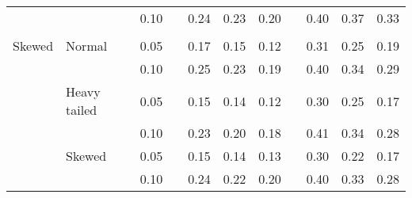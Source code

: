 \begin{table}[ht]
\begin{scriptsize}
\begin{center}
\begin{tabular}{ll p{.1cm} c p{.1cm} rrr p{.1cm} rrr}
             &              && 0.10 &&  0.24 & 0.23 & 0.20 && 0.40 & 0.37 & 0.33 \\ 
             &&&&&&&&&&&\\
Skewed       & Normal       && 0.05 &&  0.17 & 0.15 & 0.12 && 0.31 & 0.25 & 0.19 \\ 
             &              && 0.10 &&  0.25 & 0.23 & 0.19 && 0.40 & 0.34 & 0.29 \\ 
             & Heavy tailed && 0.05 &&  0.15 & 0.14 & 0.12 && 0.30 & 0.25 & 0.17 \\ 
             &              && 0.10 &&  0.23 & 0.20 & 0.18 && 0.41 & 0.34 & 0.28 \\ 
             & Skewed       && 0.05 &&  0.15 & 0.14 & 0.13 && 0.30 & 0.22 & 0.17 \\ 
             &              && 0.10 &&  0.24 & 0.22 & 0.20 && 0.40 & 0.33 & 0.28 \\ 

\hline
\end{tabular}
\end{center}
\end{scriptsize}
\end{table}

